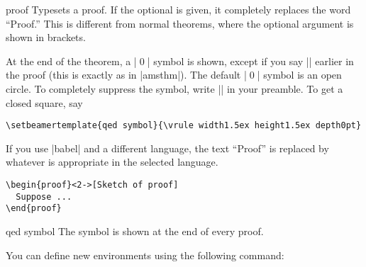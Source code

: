 \begin{environment}{{proof}}
  Typesets a proof. If the optional  is given, it completely replaces the word ``Proof.'' This is different from normal theorems, where the optional argument is shown in brackets.

  At the end of the theorem, a |\qed| symbol is shown, except if you say |\qedhere| earlier in the proof (this is exactly as in |amsthm|). The default |\qed| symbol is an open circle. To completely suppress the symbol, write |\def\qedsymbol{}| in your preamble. To get a closed square, say
\begin{verbatim}
\setbeamertemplate{qed symbol}{\vrule width1.5ex height1.5ex depth0pt}
\end{verbatim}

  If you use |babel| and a different language, the text ``Proof'' is replaced by whatever is appropriate in the selected language.

  \example
\begin{verbatim}
\begin{proof}<2->[Sketch of proof]
  Suppose ...
\end{proof}
\end{verbatim}

  \begin{element}{qed symbol}\yes\yes\yes
    The symbol is shown at the end of every proof.
  \end{element}
\end{environment}

You can define new environments using the following command:


